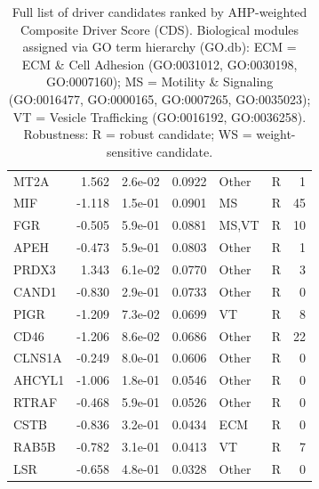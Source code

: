 \begin{table}[ht]
\begin{tabular}{lrlrllr}
  MT2A & 1.562 & 2.6e-02 & 0.0922 & Other & R & 1 \\ 
  MIF & -1.118 & 1.5e-01 & 0.0901 & MS & R & 45 \\ 
  FGR & -0.505 & 5.9e-01 & 0.0881 & MS,VT & R & 10 \\ 
  APEH & -0.473 & 5.9e-01 & 0.0803 & Other & R & 1 \\ 
  PRDX3 & 1.343 & 6.1e-02 & 0.0770 & Other & R & 3 \\ 
  CAND1 & -0.830 & 2.9e-01 & 0.0733 & Other & R & 0 \\ 
  PIGR & -1.209 & 7.3e-02 & 0.0699 & VT & R & 8 \\ 
  CD46 & -1.206 & 8.6e-02 & 0.0686 & Other & R & 22 \\ 
  CLNS1A & -0.249 & 8.0e-01 & 0.0606 & Other & R & 0 \\ 
  AHCYL1 & -1.006 & 1.8e-01 & 0.0546 & Other & R & 0 \\ 
  RTRAF & -0.468 & 5.9e-01 & 0.0526 & Other & R & 0 \\ 
  CSTB & -0.836 & 3.2e-01 & 0.0434 & ECM & R & 0 \\ 
  RAB5B & -0.782 & 3.1e-01 & 0.0413 & VT & R & 7 \\ 
  LSR & -0.658 & 4.8e-01 & 0.0328 & Other & R & 0 \\ 
   \hline
\end{tabular}
\caption{Full list of driver candidates ranked by AHP-weighted Composite Driver Score (CDS). 
    Biological modules assigned via GO term hierarchy (GO.db): ECM = ECM \& Cell Adhesion 
    (GO:0031012, GO:0030198, GO:0007160); MS = Motility \& Signaling (GO:0016477, GO:0000165, 
    GO:0007265, GO:0035023); VT = Vesicle Trafficking (GO:0016192, GO:0036258). 
    Robustness: R = robust candidate; WS = weight-sensitive candidate.} 
\label{tab:candidates}
\end{table}
